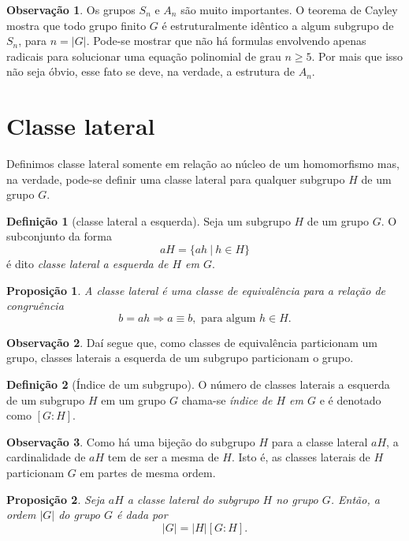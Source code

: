 \documentclass[a4paper,12pt]{report}
\theoremstyle{plain}
\newtheorem{proposicao}{Proposição}[section]
\theoremstyle{definition}
\newtheorem{definicao}{Definição}[section]
\newtheorem{observacao}{Observação}[section]
\begin{document}
\begin{observacao}
	Os grupos $S_n$ e $A_n$ são muito importantes. O teorema de Cayley mostra que todo grupo finito $G$ é estruturalmente idêntico a algum subgrupo de $S_n$, para $n = |G|$. Pode-se mostrar que não há formulas envolvendo apenas radicais para solucionar uma equação polinomial de grau $n\geq 5$. Por mais que isso não seja óbvio, esse fato se deve, na verdade, a estrutura de $A_n$.
\end{observacao}


\section{Classe lateral}

Definimos classe lateral somente em relação ao núcleo de um homomorfismo mas,
na verdade, pode-se definir uma classe lateral para qualquer subgrupo \(H\) de
um grupo \(G\).

\begin{definicao}[classe lateral a esquerda]
	Seja um subgrupo \(H\) de um grupo \(G\). O
	subconjunto da forma \[aH = \{ah \ | \ h\in H\}\] é dito \emph{classe lateral a esquerda de \(H\) em \(G\)}.
\end{definicao}

\begin{proposicao}
	A classe lateral é uma classe de equivalência para a
	relação de congruência
	\[b = ah \Rightarrow a \equiv b, \text{ para algum } h\in H.\]	
\end{proposicao}

\begin{observacao}
	Daí segue que, como classes de equivalência particionam um grupo,
	classes laterais a esquerda de um subgrupo particionam o grupo.
\end{observacao}

\begin{definicao}[Índice de um subgrupo]
	O número de classes laterais a esquerda de um subgrupo
	\(H\) em um grupo \(G\) chama-se \emph{índice de \(H\) em \(G\)} e é
	denotado como \([G:H]\).	
\end{definicao}

\begin{observacao}
	Como há uma bijeção do subgrupo \(H\) para a classe lateral \(aH\), a
	cardinalidade de \(aH\) tem de ser a mesma de \(H\). Isto é, as
	classes laterais de \(H\) particionam \(G\) em partes de mesma ordem.
\end{observacao}

\begin{proposicao}
	Seja \(aH\) a classe lateral do subgrupo \(H\) no grupo
	\(G\). Então, a ordem \(|G|\) do grupo \(G\) é dada por
	\[|G| = |H|[G:H].\]	
\end{proposicao}
\end{document}
